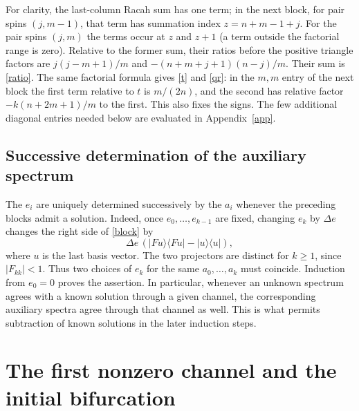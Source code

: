 \documentclass[11pt]{article}
\newcommand{\pr}[1]{|#1\rangle\langle#1|}
\begin{document}
For clarity, the last-column Racah sum has one term; in the next block, for pair spins $(j,m-1)$, that term has summation index $z=n+m-1+j$. For the pair spins $(j,m)$ the terms occur at $z$ and $z+1$ (a term outside the factorial range is zero). Relative to the former sum, their ratios before the positive triangle factors are $j(j-m+1)/m$ and $-(n+m+j+1)(n-j)/m$. Their sum is \eqref{ratio}. The same factorial formula gives \eqref{t} and \eqref{qr}: in the $m,m$ entry of the next block the first term relative to $t$ is $m/(2n)$, and the second has relative factor $-k(n+2m+1)/m$ to the first. This also fixes the signs. The few additional diagonal entries needed below are evaluated in Appendix~\ref{app}.

\subsection{Successive determination of the auxiliary spectrum}
The $e_i$ are uniquely determined successively by the $a_i$ whenever the preceding blocks admit a solution. Indeed, once $e_0,\ldots,e_{k-1}$ are fixed, changing $e_k$ by $\Delta e$ changes the right side of \eqref{block} by
\[
 \Delta e\, (\pr{Fu}-\pr{u}),
\]
where $u$ is the last basis vector. The two projectors are distinct for $k\ge1$, since $|F_{kk}|<1$. Thus two choices of $e_k$ for the same $a_0,\ldots,a_k$ must coincide. Induction from $e_0=0$ proves the assertion. In particular, whenever an unknown spectrum agrees with a known solution through a given channel, the corresponding auxiliary spectra agree through that channel as well. This is what permits subtraction of known solutions in the later induction steps.

\section{The first nonzero channel and the initial bifurcation}\label{initial}
\end{document}
